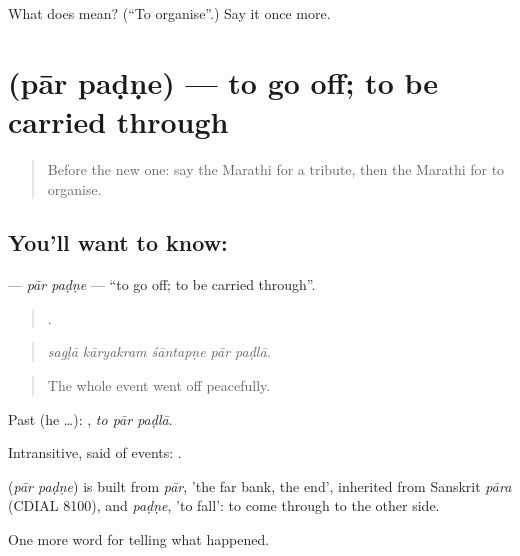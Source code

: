 \begin{tcolorbox}[breakable,colback=teal!4,colframe=teal!35!black,title={Before you move on}]
What does   mean? (\textquotedblleft{}To organise\textquotedblright{}.) Say it once more.
\end{tcolorbox}
\section[\texorpdfstring{\mr{पार} \mr{पडणे} (pār paḍṇe)}{पार पडणे (pār paḍṇe)}]{  (pār paḍṇe) — to go off; to be carried through}

\label{lesson:MR-C324-par-padne}



\begin{quote}
Before the new one: say the Marathi for a tribute, then the Marathi for to organise.
\end{quote}

\subsection*{You'll want to know:  }
\textbf{ } — \emph{pār paḍṇe} — \textquotedblleft{}to go off; to be carried through\textquotedblright{}.

\begin{quote}
    .
\end{quote}

\begin{quote}
\emph{sagḷā kāryakram śāntapṇe pār paḍlā.}
\end{quote}

\begin{quote}
The whole event went off peacefully.
\end{quote}

Past (he …):   , \emph{to pār paḍlā}.

Intransitive, said of events:    .

\begin{cousinweb}
\textbf{ } (\emph{pār paḍṇe}) is built from \emph{pār}, 'the far bank, the end', inherited from Sanskrit \emph{pāra} (CDIAL 8100), and \emph{paḍṇe}, 'to fall': to come through to the other side.
\end{cousinweb}

\begin{grammarlens}[title={What you've built}]
One more word for telling what happened.
\end{grammarlens}

